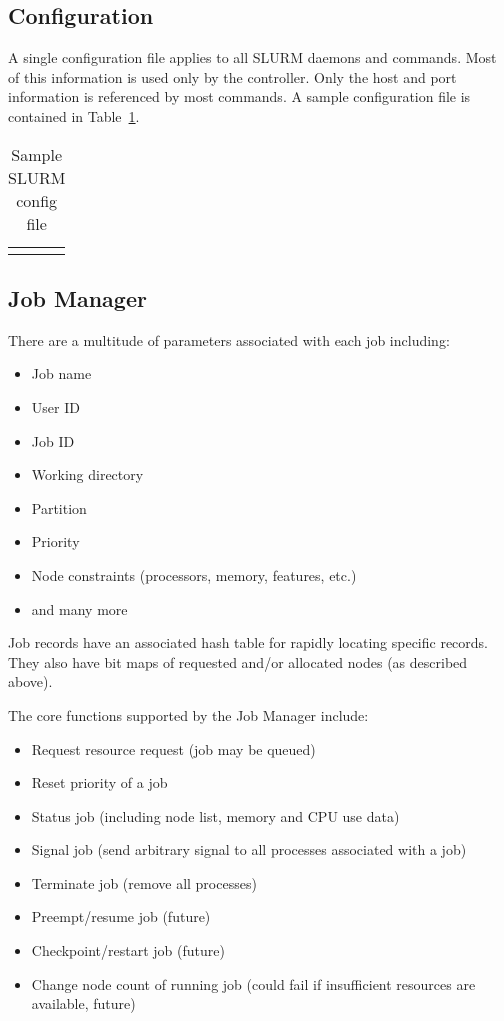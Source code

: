 \documentclass[10pt,onecolumn,times]{../common/llncs}
\begin{document}
{\subsection{Configuration}

A single configuration file applies to all SLURM daemons and commands.
Most of this information is used only by the controller.  Only the
host and port information is referenced by most commands.  A sample
configuration file is contained in Table~\ref{sample_config}.


\begin{table}[t]
\begin{center}
\begin{tabular}[c]{c}
\\
\fbox{ 
   \begin{minipage}[c]{0.8\linewidth}
     {\tiny  } 
   \end{minipage} 
}
\\
\end{tabular}
\caption{Sample SLURM config file \label{sample_config}}
\end{center}
\end{table}

\subsection{Job Manager}

There are a multitude of parameters associated with each job including:
\begin{itemize}
\item Job name
\item User ID
\item Job ID
\item Working directory
\item Partition
\item Priority
\item Node constraints (processors, memory, features, etc.)
\item and many more
\end{itemize}

Job records have an associated hash table for rapidly locating 
specific records. They also have bit maps of requested and/or 
allocated nodes (as described above).

The core functions supported by the Job Manager include:
\begin{itemize}
\item Request resource request (job may be queued)
\item Reset priority of a job
\item Status job (including node list, memory and CPU use data)
\item Signal job (send arbitrary signal to all processes associated 
      with a job)
\item Terminate job (remove all processes)
\item Preempt/resume job  (future)
\item Checkpoint/restart job (future)
\item Change node count of running job (could fail if insufficient 
resources are available, future)
\end{itemize}

}
\end{document}
